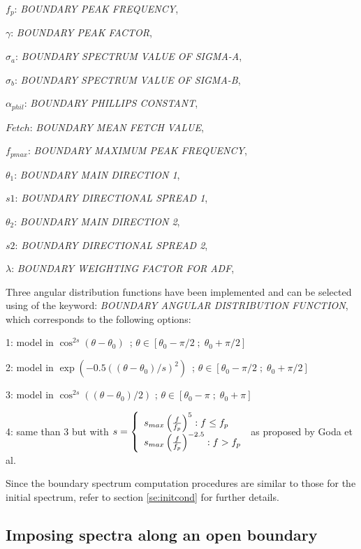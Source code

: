  $f_p$:  \textit{BOUNDARY PEAK FREQUENCY},

 $\gamma$:  \textit{BOUNDARY PEAK FACTOR},

 $\sigma_a$:  \textit{BOUNDARY SPECTRUM VALUE OF SIGMA-A},

 $\sigma_b$:  \textit{BOUNDARY SPECTRUM VALUE OF SIGMA-B},

 $\alpha_{phil}$:  \textit{BOUNDARY PHILLIPS CONSTANT},

 $Fetch$:  \textit{BOUNDARY MEAN FETCH VALUE},

 $f_{pmax}$:  \textit{BOUNDARY MAXIMUM PEAK FREQUENCY},

 $\theta_1$:  \textit{BOUNDARY MAIN DIRECTION 1},

 $s1$:  \textit{BOUNDARY DIRECTIONAL SPREAD 1},

 $\theta_2$:  \textit{BOUNDARY MAIN DIRECTION 2},

 $s2$:  \textit{BOUNDARY DIRECTIONAL SPREAD 2},

 $\lambda$:  \textit{BOUNDARY WEIGHTING FACTOR FOR ADF},

 Three angular distribution functions have been implemented and can be selected using of the keyword: \textit{BOUNDARY ANGULAR DISTRIBUTION FUNCTION}, which corresponds to the following options:

 1:  model in $\cos ^{2s} (\theta -\theta _{0} )$~; $\theta \in \left[\theta _{0} -\pi /2\; ;\; \theta _{0} +\pi /2\right]$

 2:  model in $\exp \left(-0.5\left(\left(\theta -\theta _{0} \right)/s\right)^{2} \right)$~; $\theta \in \left[\theta _{0} -\pi /2\; ;\; \theta _{0} +\pi /2\right]$

 3:  model in $\cos ^{2s} \left(\left(\theta -\theta _{0} \right)/2\right)$ ; $\theta \in \left[\theta _{0} -\pi \; ;\; \theta _{0} +\pi \right]$  \cite{Mitsuyasu1975}

 4: same than 3 but with $ s=\left\{ \barr{l} s_{max} \left(\frac{f}{f_p} \right)^5 : f\le f_p \\
 s_{max} \left(\frac{f}{f_p} \right)^{-2.5} : f > f_p \earr\right. $ as proposed by Goda et al. \cite{Goda1975}
 

 Since the boundary spectrum computation procedures are similar to those for the initial spectrum, refer to section \ref{se:initcond} for further details.

\subsection{ Imposing spectra along an open boundary}

